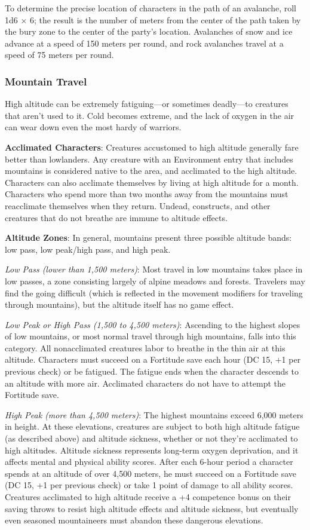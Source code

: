 To determine the precise location of characters in the path of an avalanche, roll 1d6 $\times$ 6; the result is the number of meters from the center of the path taken by the bury zone to the center of the party's location. Avalanches of snow and ice advance at a speed of 150 meters per round, and rock avalanches travel at a speed of 75 meters per round.

\subsubsection{Mountain Travel}
High altitude can be extremely fatiguing---or sometimes deadly---to creatures that aren't used to it. Cold becomes extreme, and the lack of oxygen in the air can wear down even the most hardy of warriors.

\textbf{Acclimated Characters}: Creatures accustomed to high altitude generally fare better than lowlanders. Any creature with an Environment entry that includes mountains is considered native to the area, and acclimated to the high altitude. Characters can also acclimate themselves by living at high altitude for a month. Characters who spend more than two months away from the mountains must reacclimate themselves when they return. Undead, constructs, and other creatures that do not breathe are immune to altitude effects.

\textbf{Altitude Zones}: In general, mountains present three possible altitude bands: low pass, low peak/high pass, and high peak.

\textit{Low Pass (lower than 1,500 meters)}: Most travel in low mountains takes place in low passes, a zone consisting largely of alpine meadows and forests. Travelers may find the going difficult (which is reflected in the movement modifiers for traveling through mountains), but the altitude itself has no game effect.

\textit{Low Peak or High Pass (1,500 to 4,500 meters)}: Ascending to the highest slopes of low mountains, or most normal travel through high mountains, falls into this category. All nonacclimated creatures labor to breathe in the thin air at this altitude. Characters must succeed on a Fortitude save each hour (DC 15, +1 per previous check) or be fatigued. The fatigue ends when the character descends to an altitude with more air. Acclimated characters do not have to attempt the Fortitude save.

\textit{High Peak (more than 4,500 meters)}: The highest mountains exceed 6,000 meters in height. At these elevations, creatures are subject to both high altitude fatigue (as described above) and altitude sickness, whether or not they're acclimated to high altitudes. Altitude sickness represents long-term oxygen deprivation, and it affects mental and physical ability scores. After each 6-hour period a character spends at an altitude of over 4,500 meters, he must succeed on a Fortitude save (DC 15, +1 per previous check) or take 1 point of damage to all ability scores. Creatures acclimated to high altitude receive a +4 competence bonus on their saving throws to resist high altitude effects and altitude sickness, but eventually even seasoned mountaineers must abandon these dangerous elevations.